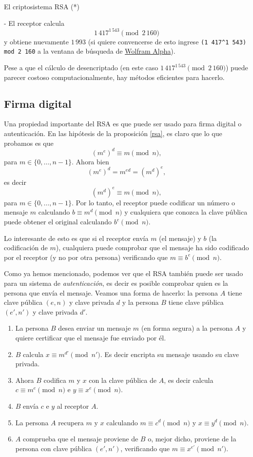 \begin{section}{El criptosistema RSA (*)}
\begin{ejemplo*}
- El receptor calcula
$$
1\,417^{1\,543} \pmod{2\,160}
$$ 
y obtiene nuevamente $1\,993$ (si quiere convencerse de esto ingrese \texttt{(1\,417\^{}1\,543) mod 2\,160} a la ventana de búsqueda de \href{https://www.wolframalpha.com}{Wolfram Alpha}).

Pese a que el cálculo de desencriptado (en este caso $1\,417^{1\,543} \pmod{2\,160}$) puede parecer costoso computacionalmente, hay métodos eficientes para hacerlo. 

\end{ejemplo*}

\subsection*{Firma digital}
Una propiedad importante del RSA es que puede ser usado para firma digital o autenticación. En las hipótesis de la proposición \ref{rsa}, es claro que lo que probamos es que 
$$
(m^e)^d \equiv m \pmod{n},
$$
para $m \in \{0,\ldots,n-1\}$. Ahora bien 
$$
(m^e)^d  = m^{ed} = (m^d)^e,  
$$
es decir
$$
(m^d)^e \equiv m \pmod{n}, 
$$
para $m \in \{0,\ldots,n-1\}$. Por lo tanto, el receptor puede codificar un número o mensaje $m$ calculando  $b \equiv m^d  \pmod{n}$ y cualquiera que conozca la clave pública puede obtener el original calculando $b^e \pmod{n}$. 

Lo interesante de esto es que si el receptor envía $m$ (el mensaje) y $b$ (la codificación de $m$), cualquiera puede comprobar que el mensaje ha sido codificado por el receptor (y no por otra persona) verificando  que   $m \equiv b^e \pmod{n}$.     


\begin{ejemplo*}
Como ya hemos mencionado, podemos ver que el RSA también puede ser usado para un sistema de \emph{autenticación}, es decir es posible comprobar quien es la persona que envía el mensaje. Veamos una forma de hacerlo: la persona $A$ tiene clave pública $(e,n)$ y clave privada $d$ y   la persona $B$  tiene clave pública $(e',n')$ y clave privada $d'$. 

\begin{enumerate}[label=\textit{\alph*)}]
    \item  La persona $B$ desea enviar un mensaje $m$ (en forma segura) a la persona $A$ y quiere certificar que el mensaje fue enviado por él.
    \item  $B$ calcula $x \equiv m^{d'} \pmod{n'}$. Es decir encripta su mensaje usando su  clave privada.
    \item  Ahora $B$ codifica $m$ y $x$ con la clave pública de $A$, es decir calcula $c \equiv m^{e} \pmod{n}$ e  $y \equiv x^e \pmod{n}$. 
    \item  $B$ envía $c$ e $y$ al receptor $A$.
    \item  La persona $A$ recupera $m$ y $x$ calculando  $m \equiv c^d \pmod{n}$ y  $x \equiv y^d \pmod{n}$.
    \item  $A$ comprueba que el mensaje  proviene de $B$ o, mejor dicho, proviene de la persona con clave pública $(e',n')$, verificando que $m \equiv x^{e'} \pmod{n'}$. 
\end{enumerate}
\end{ejemplo*}

\end{section}
